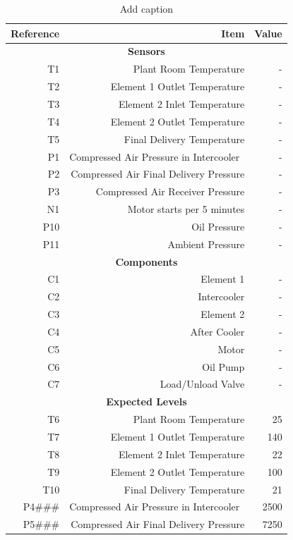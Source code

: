 \begin{table}[htbp]
  \centering
  \caption{Add caption}
    \begin{tabular}{rrr}
    \toprule
    Reference & Item  & Value \\
    \midrule
    \multicolumn{3}{c}{\textbf{Sensors}} \\
    T1    & Plant Room Temperature & - \\
    T2    & Element 1 Outlet Temperature & - \\
    T3    & Element 2 Inlet Temperature & - \\
    T4    & Element 2 Outlet Temperature & - \\
    T5    & Final Delivery Temperature & - \\
    P1    & Compressed Air Pressure in Intercooler  & - \\
    P2    & Compressed Air Final Delivery Pressure & - \\
    P3    & Compressed Air Receiver Pressure & - \\
    N1    & Motor starts per 5 minutes & - \\
    P10   & Oil Pressure & - \\
    P11   & Ambient Pressure & - \\
    \multicolumn{3}{c}{\textbf{Components}} \\
    C1    & Element 1 & - \\
    C2    & Intercooler & - \\
    C3    & Element 2 & - \\
    C4    & After Cooler & - \\
    C5    & Motor & - \\
    C6    & Oil Pump & - \\
    C7    & Load/Unload Valve & - \\
    \multicolumn{3}{c}{\textbf{Expected Levels}} \\
    T6    & Plant Room Temperature & 25 \\
    T7    & Element 1 Outlet Temperature & 140 \\
    T8    & Element 2 Inlet Temperature & 22 \\
    T9    & Element 2 Outlet Temperature & 100 \\
    T10   & Final Delivery Temperature & 21 \\
    P4\#\#\# & Compressed Air Pressure in Intercooler  & 2500 \\
    P5\#\#\# & Compressed Air Final Delivery Pressure & 7250 \\

\end{tabular}
\end{table}
